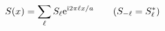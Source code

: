 \begin{equation}
S(x)=\sum_{\ell} S_{\ell} {\rm e}^{{\rm i}2\pi \ell x/a}  \qquad (S_{-\ell} = S_{\ell}^*) 
\label{d5}
\end{equation}

